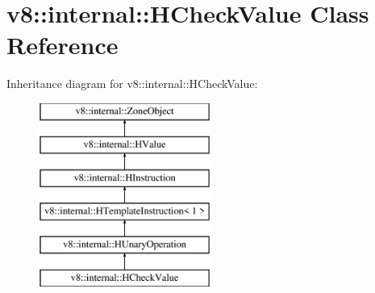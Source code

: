 \hypertarget{classv8_1_1internal_1_1_h_check_value}{}\section{v8\+:\+:internal\+:\+:H\+Check\+Value Class Reference}
\label{classv8_1_1internal_1_1_h_check_value}
Inheritance diagram for v8\+:\+:internal\+:\+:H\+Check\+Value\+:\begin{figure}[H]
\begin{center}
\leavevmode
\includegraphics[height=6.000000cm]{classv8_1_1internal_1_1_h_check_value}
\end{center}
\end{figure}
